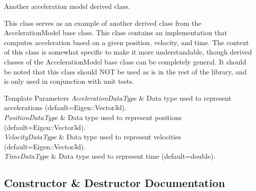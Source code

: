 Another acceleration model derived class. 

This class serves as an example of another derived class from the Acceleration\+Model base class. This class contains an implementation that computes acceleration based on a given position, velocity, and time. The context of this class is somewhat specific to make it more understandable, though derived classes of the Acceleration\+Model base class can be completely general. It should be noted that this class should N\+OT be used as is in the rest of the library, and is only used in conjunction with unit tests. 
\begin{DoxyTemplParams}{Template Parameters}
{\em Acceleration\+Data\+Type} & Data type used to represent accelerations (default=Eigen\+::\+Vector3d). \\
\hline
{\em Position\+Data\+Type} & Data type used to represent positions (default=Eigen\+::\+Vector3d). \\
\hline
{\em Velocity\+Data\+Type} & Data type used to represent velocities (default=Eigen\+::\+Vector3d). \\
\hline
{\em Time\+Data\+Type} & Data type used to represent time (default=double). \\
\hline
\end{DoxyTemplParams}


\subsection{Constructor \& Destructor Documentation}
